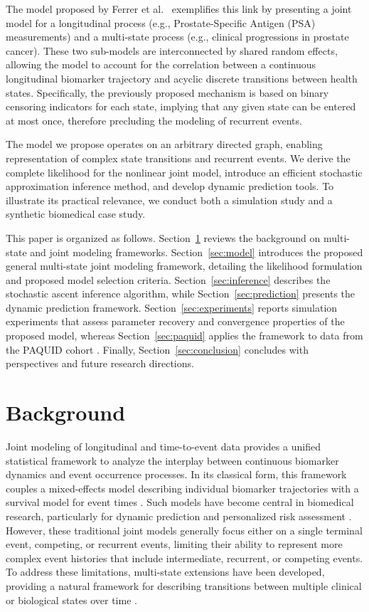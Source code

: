 \documentclass{sn-jnl}
\begin{document}
The model proposed by Ferrer et al.~\citep{ferrer2016joint} exemplifies this link by presenting a joint model for a longitudinal process (e.g., Prostate-Specific Antigen (PSA) measurements) and a multi-state process (e.g., clinical progressions in prostate cancer). These two sub-models are interconnected by shared random effects, allowing the model to account for the correlation between a continuous longitudinal biomarker trajectory and acyclic discrete transitions between health states. Specifically, the previously proposed mechanism \citep{ferrer2016joint, you2024joint} is based on binary censoring indicators for each state, implying that any given state can be entered at most once, therefore precluding the modeling of recurrent events.

The model we propose operates on an arbitrary directed graph, enabling representation of complex state transitions and recurrent events. We derive the complete likelihood for the nonlinear joint model, introduce an efficient stochastic approximation inference method, and develop dynamic prediction tools. To illustrate its practical relevance, we conduct both a simulation study and a synthetic biomedical case study.

This paper is organized as follows. Section~\ref{sec:background} reviews the background on multi-state and joint modeling frameworks. Section~\ref{sec:model} introduces the proposed general multi-state joint modeling framework, detailing the likelihood formulation and proposed model selection criteria. Section~\ref{sec:inference} describes the stochastic ascent inference algorithm, while Section~\ref{sec:prediction} presents the dynamic prediction framework. Section~\ref{sec:experiments} reports simulation experiments that assess parameter recovery and convergence properties of the proposed model, whereas Section~\ref{sec:paquid} applies the framework to data from the PAQUID cohort \citep{Letenneur1994}. Finally, Section~\ref{sec:conclusion} concludes with perspectives and future research directions.

\section{Background} \label{sec:background}

Joint modeling of longitudinal and time-to-event data provides a unified statistical framework to analyze the interplay between continuous biomarker dynamics and event occurrence processes. In its classical form, this framework couples a mixed-effects model describing individual biomarker trajectories with a survival model for event times \citep{rizopoulos2012joint}. Such models have become central in biomedical research, particularly for dynamic prediction and personalized risk assessment \citep{papageorgiou2019overview}. However, these traditional joint models generally focus either on a single terminal event, competing, or recurrent events, limiting their ability to represent more complex event histories that include intermediate, recurrent, or competing events. To address these limitations, multi-state extensions have been developed, providing a natural framework for describing transitions between multiple clinical or biological states over time \citep{ferrer2016joint, KrolMauguen2017}.
\end{document}
